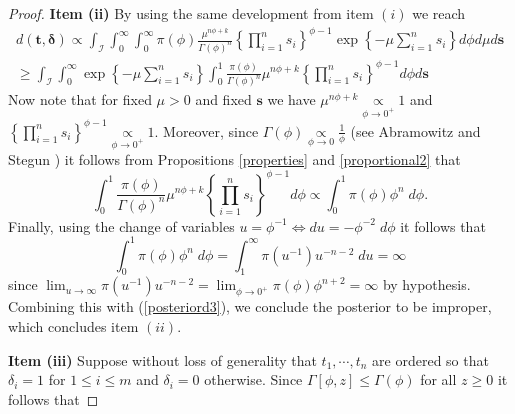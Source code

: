 \documentclass[]{interact}
\theoremstyle{plain}%
\theoremstyle{definition}
\theoremstyle{remark}
\begin{document}
\begin{appendix}
\begin{proof}
\vspace{0.3cm}
\noindent \textbf{Item (ii)} By using the same development from item $(i)$ we reach
 \begin{equation}
 \begin{aligned}
 \label{posteriord3}
d(\boldsymbol{t,\delta})\propto \int_{\mathcal{I}} \int_{0}^{\infty}\int_{0}^{\infty}\pi(\phi)\frac{\mu^{n\phi+k}}{\Gamma(\phi)^n}\left\{\prod_{i=1}^n{s_i}\right\}^{\phi-1}\exp\left\{-\mu\sum_{i=1}^n s_i\right\}d\phi d\mu d\boldsymbol{s} \\
\geq \int_{\mathcal{I}} \int_{0}^{\infty}\exp\left\{-\mu\sum_{i=1}^n s_i\right\}     \int_{0}^{1}\frac{\pi(\phi)}{\Gamma(\phi)^n}\mu^{n\phi+k}\left\{\prod_{i=1}^n{s_i}\right\}^{\phi-1} d\phi  d\boldsymbol{s}
\end{aligned}
\end{equation}
Now note that for fixed $\mu>0$ and fixed $\boldsymbol{s}$ we have $\mu^{n\phi+k}\underset{\phi\to 0^+}{\propto} 1$ and $\left\{\prod_{i=1}^n{s_i}\right\}^{\phi-1}\underset{\phi\to 0^+}{\propto} 1$. Moreover, since $\Gamma(\phi)\underset{\phi \to 0}{\propto} \frac{1}{\phi}$ (see Abramowitz and Stegun \cite{abramowitz}) it follows from Propositions \ref{properties} and \ref{proportional2} that
\begin{equation*}
\int_{0}^{1}\frac{\pi(\phi)}{\Gamma(\phi)^n}\mu^{n\phi+k}\left\{\prod_{i=1}^n{s_i}\right\}^{\phi-1} d\phi  \propto \int_{0}^{1}\pi(\phi)\phi^n\; d\phi.
\end{equation*}
Finally, using the change of variables $u=\phi^{-1}\Leftrightarrow du=-\phi^{-2}\; d\phi$ it follows that
\begin{equation*} \int_{0}^{1}\pi(\phi)\phi^n\; d\phi = \int_1^\infty \pi(u^{-1})u^{-n-2}\; du = \infty
\end{equation*}
since $\lim_{u\to \infty} \pi(u^{-1})u^{-n-2} = \lim_{\phi\to 0^+} \pi(\phi)\phi^{n+2} = \infty$ by hypothesis. Combining this with (\ref{posteriord3}), we conclude the posterior to be improper, which concludes item $(ii)$.

\vspace{0.3cm}
\noindent \textbf{Item (iii)} Suppose without loss of generality that $t_1,\cdots,t_n$ are ordered so that $\delta_i=1$ for $1\leq i\leq m$ and $\delta_i=0$ otherwise. Since $\Gamma[\phi,z]\leq \Gamma(\phi)$ for all $z\geq 0$ it follows that


\end{proof}
\end{appendix}
\end{document}
